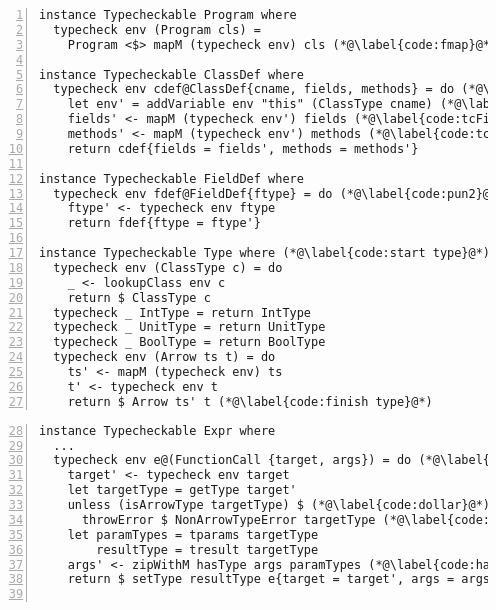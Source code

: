 \documentclass[sigplan,screen]{acmart}
\begin{document}
\begin{figure*}[ht]
\begin{minipage}[t]{.45\linewidth}
\begin{lstlisting}[style=encore,numbers=left]
instance Typecheckable Program where
  typecheck env (Program cls) =
    Program <$> mapM (typecheck env) cls (*@\label{code:fmap}@*)

instance Typecheckable ClassDef where
  typecheck env cdef@ClassDef{cname, fields, methods} = do (*@\label{code:pun1}@*)
    let env' = addVariable env "this" (ClassType cname) (*@\label{code:tcThis}@*)
    fields' <- mapM (typecheck env') fields (*@\label{code:tcFields}@*)
    methods' <- mapM (typecheck env') methods (*@\label{code:tcMethods}@*)
    return cdef{fields = fields', methods = methods'}

instance Typecheckable FieldDef where
  typecheck env fdef@FieldDef{ftype} = do (*@\label{code:pun2}@*)
    ftype' <- typecheck env ftype
    return fdef{ftype = ftype'}

instance Typecheckable Type where (*@\label{code:start type}@*)
  typecheck env (ClassType c) = do
    _ <- lookupClass env c
    return $ ClassType c
  typecheck _ IntType = return IntType
  typecheck _ UnitType = return UnitType
  typecheck _ BoolType = return BoolType
  typecheck env (Arrow ts t) = do
    ts' <- mapM (typecheck env) ts
    t' <- typecheck env t
    return $ Arrow ts' t (*@\label{code:finish type}@*)
\end{lstlisting}
\end{minipage}
%
\begin{minipage}[t]{.45\linewidth}
\begin{lstlisting}[style=encore,firstnumber=28,xleftmargin=6ex,numbers=left]
instance Typecheckable Expr where
  ...
  typecheck env e@(FunctionCall {target, args}) = do (*@\label{code:eg:functioncallStart}@*)
    target' <- typecheck env target
    let targetType = getType target'
    unless (isArrowType targetType) $ (*@\label{code:dollar}@*)
      throwError $ NonArrowTypeError targetType (*@\label{code:throwError}@*)
    let paramTypes = tparams targetType
        resultType = tresult targetType
    args' <- zipWithM hasType args paramTypes (*@\label{code:hasType1}@*)
    return $ setType resultType e{target = target', args = args'}(*@\label{code:eg:functioncallEnd}@*)


\end{lstlisting}
\end{minipage}
\end{figure*}
\end{document}
